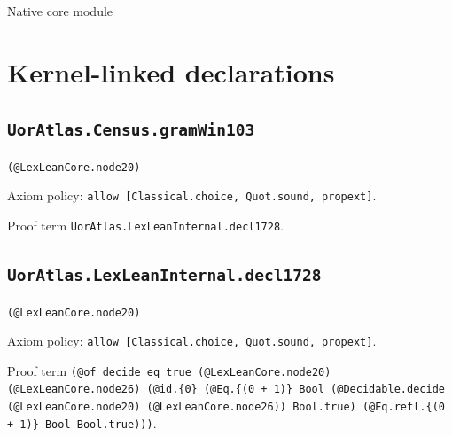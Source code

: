 \documentclass[11pt]{article}
\begin{document}
\begin{center}{\LARGE Native core module}\end{center}
\section*{Kernel-linked declarations}
\subsection*{\texttt{UorAtlas.Census.gramWin103}}
\noindent\texttt{(@LexLeanCore.node20)}\par
\noindent Axiom policy: \texttt{allow [Classical.choice, Quot.sound, propext]}.\par
\noindent Proof term \texttt{UorAtlas.LexLeanInternal.decl1728}.\par
\subsection*{\texttt{UorAtlas.LexLeanInternal.decl1728}}
\noindent\texttt{(@LexLeanCore.node20)}\par
\noindent Axiom policy: \texttt{allow [Classical.choice, Quot.sound, propext]}.\par
\noindent Proof term \texttt{(@of\_decide\_eq\_true (@LexLeanCore.node20) (@LexLeanCore.node26) (@id.\{0\} (@Eq.\{(0 + 1)\} Bool (@Decidable.decide (@LexLeanCore.node20) (@LexLeanCore.node26)) Bool.true) (@Eq.refl.\{(0 + 1)\} Bool Bool.true)))}.\par
\end{document}
